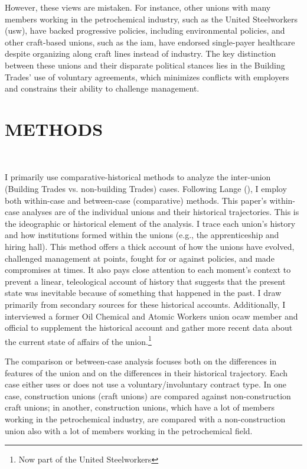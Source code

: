 \documentclass[12pt]{article}
\begin{document}
However, these views are mistaken. For instance, other unions with many members working in the petrochemical industry, such as the United Steelworkers (\acrshort{usw}), have backed progressive policies, including environmental policies, and other craft-based unions, such as the \acrfull{iam}, have endorsed single-payer healthcare despite organizing along craft lines instead of industry. The key distinction between these unions and their disparate political stances lies in the Building Trades' use of voluntary agreements, which minimizes conflicts with employers and constrains their ability to challenge management.


\section{METHODS} \

I primarily use comparative-historical methods to analyze the inter-union (Building Trades vs. non-building Trades) cases. Following Lange (\citeyear{langeComparativeHistoricalMethods2013}), I employ both within-case and between-case (comparative) methods. This paper's within-case analyses are of the individual unions and their historical trajectories. This is the ideographic or historical element of the analysis. I trace each union's history and how institutions formed within the unions (e.g., the apprenticeship and hiring hall). This method offers a thick account of how the unions have evolved, challenged management at points, fought for or against policies, and made compromises at times. It also pays close attention to each moment's context to prevent a linear, teleological account of history that suggests that the present state was inevitable because of something that happened in the past. I draw primarily from secondary sources for these historical accounts. Additionally, I interviewed a former Oil Chemical and Atomic Workers union \acrshort{ocaw} member and official to supplement the historical account and gather more recent data about the current state of affairs of the union.\footnote{Now part of the United Steelworkers}

The comparison or between-case analysis focuses both on the differences in features of the union and on the differences in their historical trajectory. Each case either uses or does not use a voluntary/involuntary contract type. In one case, construction unions (craft unions) are compared against non-construction craft unions; in another, construction unions, which have a lot of members working in the petrochemical industry, are compared with a non-construction union also with a lot of members working in the petrochemical field.
\end{document}
